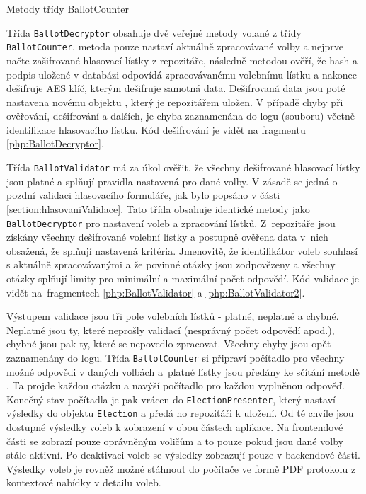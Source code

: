\begin{listing}[ht]
\caption{Metody třídy BallotCounter}
\label{php:BallotCounter}
\end{listing}

Třída \texttt{BallotDecryptor} obsahuje dvě veřejné metody volané z třídy \texttt{BallotCounter}, metoda  pouze nastaví aktuálně zpracovávané volby a  nejprve načte zašifrované hlasovací lístky z repozitáře, následně metodou %
 ověří, že hash a podpis uložené v databázi odpovídá zpracovávanému volebnímu lístku a nakonec dešifruje AES klíč, kterým dešifruje samotná data. Dešifrovaná data jsou poté nastavena novému objektu , který je repozitářem uložen. V případě chyby při ověřování, dešifrování a dalších, je chyba zaznamenána do logu (souboru) včetně identifikace hlasovacího lístku. Kód dešifrování je vidět na fragmentu \ref{php:BallotDecryptor}.
  
Třída \texttt{BallotValidator} má za úkol ověřit, že všechny dešifrované hlasovací lístky jsou platné a splňují pravidla nastavená pro dané volby. V zásadě se jedná o pozdní validaci hlasovacího formuláře, jak bylo popsáno v části \ref{section:hlasovaniValidace}. Tato třída obsahuje identické metody jako \texttt{BallotDecryptor} pro nastavení voleb a zpracování lístků. Z~repozitáře jsou získány všechny dešifrované volební lístky a postupně ověřena data v~nich obsažená, že splňují nastavená kritéria. Jmenovitě, že identifikátor voleb souhlasí s aktuálně zpracovávanými a že povinné otázky jsou zodpovězeny a všechny otázky splňují limity pro minimální a maximální počet odpovědí. Kód validace je vidět na~fragmentech \ref{php:BallotValidator} a \ref{php:BallotValidator2}.

Výstupem validace jsou tři pole volebních lístků - platné, neplatné a chybné. Neplatné jsou ty, které neprošly validací (nesprávný počet odpovědí apod.), chybné jsou pak ty, které se nepovedlo zpracovat. Všechny chyby jsou opět zaznamenány do logu. Třída \texttt{BallotCounter} si připraví počítadlo pro všechny možné odpovědi v daných volbách a~platné lístky jsou předány ke sčítání metodě %
. Ta projde každou otázku a navýší počítadlo pro každou vyplněnou odpověď. Konečný stav počítadla je pak vrácen do \texttt{ElectionPresenter}, který nastaví výsledky do objektu \texttt{Election} a předá ho repozitáři k uložení. Od té chvíle jsou dostupné výsledky voleb k zobrazení v obou částech aplikace. Na frontendové části se zobrazí pouze oprávněným voličům a to pouze pokud jsou dané volby stále aktivní. Po deaktivaci voleb se výsledky zobrazují pouze v backendové části. Výsledky voleb je rovněž možné stáhnout do počítače ve formě PDF protokolu z kontextové nabídky v detailu voleb.

